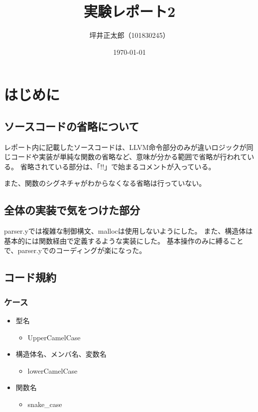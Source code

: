 \documentclass[a4paper,12pt]{jsarticle}
\begin{document}
\title{実験レポート2}
\author{坪井正太郎（101830245）}
\date{\today}
\maketitle
\section{はじめに}
\subsection{ソースコードの省略について}
レポート内に記載したソースコードは、LLVM命令部分のみが違いロジックが同じコードや実装が単純な関数の省略など、意味が分かる範囲で省略が行われている。
省略されている部分は、「!!」で始まるコメントが入っている。

また、関数のシグネチャがわからなくなる省略は行っていない。

\subsection{全体の実装で気をつけた部分}
parser.yでは複雑な制御構文、mallocは使用しないようにした。
また、構造体は基本的には関数経由で定義するような実装にした。
基本操作のみに縛ることで、parser.yでのコーディングが楽になった。

\subsection{コード規約}
\subsubsection*{ケース}
\begin{itemize}
  \item 型名
        \begin{itemize}
          \item UpperCamelCase
        \end{itemize}
  \item 構造体名、メンバ名、変数名
        \begin{itemize}
          \item lowerCamelCase
        \end{itemize}
  \item 関数名
        \begin{itemize}
          \item snake\_case
        \end{itemize}
\end{itemize}
\end{document}
